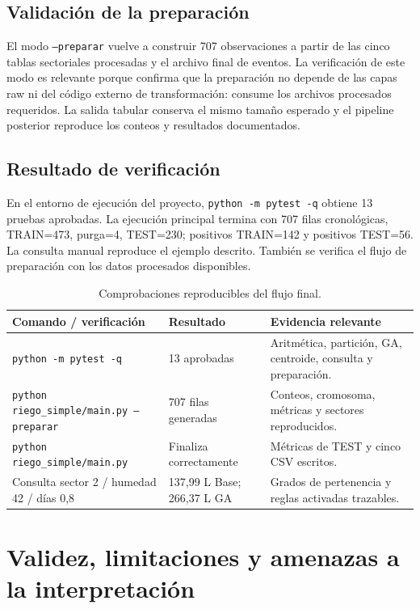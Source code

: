 \documentclass[11pt,letterpaper]{article}
\newcommand{\codigo}[1]{\texttt{\small #1}}
\begin{document}
\subsection{Validación de la preparación}
El modo \codigo{--preparar} vuelve a construir 707 observaciones a partir de las cinco tablas sectoriales procesadas y el archivo final de eventos. La verificación de este modo es relevante porque confirma que la preparación no depende de las capas raw ni del código externo de transformación: consume los archivos procesados requeridos. La salida tabular conserva el mismo tamaño esperado y el pipeline posterior reproduce los conteos y resultados documentados.

\subsection{Resultado de verificación}
En el entorno de ejecución del proyecto, \codigo{python -m pytest -q} obtiene 13 pruebas aprobadas. La ejecución principal termina con 707 filas cronológicas, TRAIN=473, purga=4, TEST=230; positivos TRAIN=142 y positivos TEST=56. La consulta manual reproduce el ejemplo descrito. También se verifica el flujo de preparación con los datos procesados disponibles.

\begin{table}[H]
\centering
\caption{Comprobaciones reproducibles del flujo final.}\label{tab:verificacion}
\begin{tabularx}{\textwidth}{p{5cm}p{3cm}X}
\toprule
Comando / verificación & Resultado & Evidencia relevante\\
\midrule
\codigo{python -m pytest -q} & 13 aprobadas & Aritmética, partición, GA, centroide, consulta y preparación.\\
\codigo{python riego\_simple/main.py --preparar} & 707 filas generadas & Conteos, cromosoma, métricas y sectores reproducidos.\\
\codigo{python riego\_simple/main.py} & Finaliza correctamente & Métricas de TEST y cinco CSV escritos.\\
Consulta sector 2 / humedad 42 / días 0,8 & 137,99 L Base; 266,37 L GA & Grados de pertenencia y reglas activadas trazables.\\
\bottomrule
\end{tabularx}
\end{table}

\section{Validez, limitaciones y amenazas a la interpretación}
\end{document}
